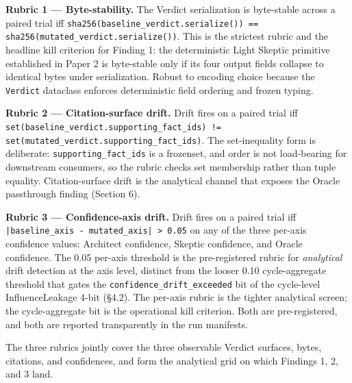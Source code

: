 \documentclass[sigconf,anonymous,review,nonacm=false]{acmart}
\begin{document}
\textbf{Rubric 1 — Byte-stability.} The Verdict serialization is byte-stable across a paired trial iff \texttt{sha256(baseline\_verdict.serialize()) == sha256(mutated\_verdict.serialize())}. This is the strictest rubric and the headline kill criterion for Finding 1: the deterministic Light Skeptic primitive established in Paper 2 \citep{gmys-casiano-2026} is byte-stable only if its four output fields collapse to identical bytes under serialization. Robust to encoding choice because the \texttt{Verdict} dataclass enforces deterministic field ordering and frozen typing.

\textbf{Rubric 2 — Citation-surface drift.} Drift fires on a paired trial iff \texttt{set(baseline\_verdict.supporting\_fact\_ids) != set(mutated\_verdict.supporting\_fact\_ids)}. The set-inequality form is deliberate: \texttt{supporting\_fact\_ids} is a frozenset, and order is not load-bearing for downstream consumers, so the rubric checks set membership rather than tuple equality. Citation-surface drift is the analytical channel that exposes the Oracle passthrough finding (Section 6).

\textbf{Rubric 3 — Confidence-axis drift.} Drift fires on a paired trial iff \texttt{|baseline\_axis - mutated\_axis| > 0.05} on any of the three per-axis confidence values: Architect confidence, Skeptic confidence, and Oracle confidence. The 0.05 per-axis threshold is the pre-registered rubric for \textit{analytical} drift detection at the axis level, distinct from the looser 0.10 cycle-aggregate threshold that gates the \texttt{confidence\_drift\_exceeded} bit of the cycle-level InfluenceLeakage 4-bit (§4.2). The per-axis rubric is the tighter analytical screen; the cycle-aggregate bit is the operational kill criterion. Both are pre-registered, and both are reported transparently in the run manifests.

The three rubrics jointly cover the three observable Verdict surfaces, bytes, citations, and confidences, and form the analytical grid on which Findings 1, 2, and 3 land.
\end{document}
